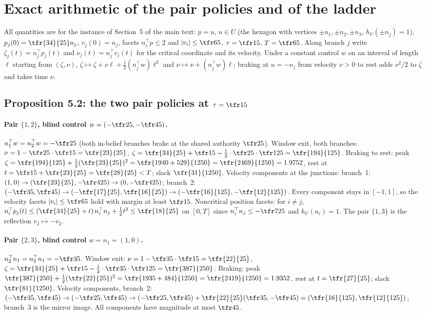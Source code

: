 \section{Exact arithmetic of the pair policies and of the ladder}\label{S:pairs}

All quantities are for the instance of Section~5 of the main text: $\ddot p=u$, $u\in U$ (the hexagon with vertices $\pm n_1,\pm n_2,\pm n_3$, $h_U(\pm n_j)=1$), $p_j(0)=\tfr{34}{25}n_j$, $v_j(0)=n_j$, facets $n_i^\top p\le2$ and $|v_i|\le\tfr65$, $\tau=\tfr15$, $T=\tfr65$. Along branch $j$ write $\zeta_j(t)=n_j^\top p_j(t)$ and $\nu_j(t)=n_j^\top v_j(t)$ for the critical coordinate and its velocity. Under a constant control $w$ on an interval of length $\ell$ starting from $(\zeta,\nu)$, $\zeta\mapsto\zeta+\nu\ell+\tfrac12(n_j^\top w)\ell^2$ and $\nu\mapsto\nu+(n_j^\top w)\ell$; braking at $u=-n_j$ from velocity $\nu>0$ to rest adds $\nu^2/2$ to $\zeta$ and takes time $\nu$.

\subsection{Proposition 5.2: the two pair policies at $\tau=\tfr15$}

\paragraph{Pair $\{1,2\}$, blind control $w=(-\tfr25,-\tfr45)$.}
$n_1^\top w=n_2^\top w=-\tfr25$ (both in-belief branches brake at the shared authority $\tfr25$). Window exit, both branches: $\nu=1-\tfr25\cdot\tfr15=\tfr{23}{25}$, $\zeta=\tfr{34}{25}+\tfr15-\tfrac12\cdot\tfr25\cdot\tfr1{25}=\tfr{194}{125}$. Braking to rest: peak $\zeta=\tfr{194}{125}+\tfrac12(\tfr{23}{25})^2=\tfr{1940+529}{1250}=\tfr{2469}{1250}=1.9752$, rest at $t=\tfr15+\tfr{23}{25}=\tfr{28}{25}<T$; slack $\tfr{31}{1250}$. Velocity components at the junctions: branch~1: $(1,0)\to(\tfr{23}{25},-\tfr4{25})\to(0,-\tfr4{25})$; branch~2: $(-\tfr35,\tfr45)\to(-\tfr{17}{25},\tfr{16}{25})\to(-\tfr{16}{125},-\tfr{12}{125})$. Every component stays in $[-1,1]$, so the velocity facets $|v_i|\le\tfr65$ hold with margin at least $\tfr15$. Noncritical position facets: for $i\ne j$, $n_i^\top p_j(t)\le(\tfr{34}{25}+t)\,n_i^\top n_j+\tfrac12t^2\le\tfr{18}{25}$ on $[0,T]$ since $n_i^\top n_j\le-\tfr7{25}$ and $h_U(n_i)=1$. The pair $\{1,3\}$ is the reflection $v_2\mapsto-v_2$.

\paragraph{Pair $\{2,3\}$, blind control $w=n_1=(1,0)$.}
$n_2^\top n_1=n_3^\top n_1=-\tfr35$. Window exit: $\nu=1-\tfr35\cdot\tfr15=\tfr{22}{25}$, $\zeta=\tfr{34}{25}+\tfr15-\tfrac12\cdot\tfr35\cdot\tfr1{25}=\tfr{387}{250}$. Braking: peak $\tfr{387}{250}+\tfrac12(\tfr{22}{25})^2=\tfr{1935+484}{1250}=\tfr{2419}{1250}=1.9352$, rest at $t=\tfr{27}{25}$; slack $\tfr{81}{1250}$. Velocity components, branch~2: $(-\tfr35,\tfr45)\to(-\tfr25,\tfr45)\to(-\tfr25,\tfr45)+\tfr{22}{25}(\tfr35,-\tfr45)=(\tfr{16}{125},\tfr{12}{125})$; branch~3 is the mirror image. All components have magnitude at most $\tfr45$.

